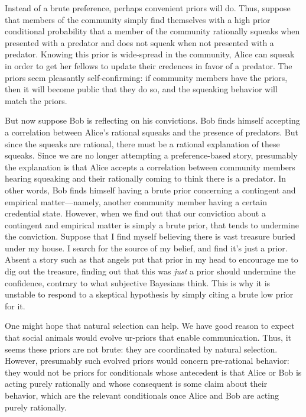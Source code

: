 Instead of a brute preference, perhaps convenient priors will do. Thus, suppose that members of the community simply find
themselves with a high prior conditional probability that a member of the community rationally squeaks when presented with a 
predator and does not squeak when not presented with a predator. Knowing this prior is wide-spread in the community, Alice can squeak in order to 
get her fellows to update their credences in favor of a predator. The priors seem pleasantly self-confirming: if community
members have the priors, then it will become public that they do so, and the squeaking behavior will match the priors.

But now suppose Bob is reflecting on his convictions. Bob finds himself accepting a correlation between Alice's rational 
squeaks and the presence of predators. But since the squeaks are rational, there must be a rational explanation of these 
squeaks. Since we are no longer attempting a preference-based story, presumably the explanation is that Alice accepts a 
correlation between community members hearing squeaking and their rationally coming to think there is a predator. In other
words, Bob finds himself having a brute prior concerning a contingent and empirical matter---namely, another community
member having a certain credential state.  However, when we find out that our conviction about a contingent and empirical 
matter is simply a brute prior, that tends to undermine the conviction. Suppose that I find myself believing there is vast treasure buried under my house. I search
for the source of my belief, and find it's just a prior. Absent a story such as that angels put that prior in my head
to encourage me to dig out the treasure, finding out that this was \textit{just} a prior should undermine the confidence,
contrary to what subjective Bayesians think. This is why it is unstable to respond to a skeptical hypothesis by simply
citing a brute low prior for it. 

One might hope that natural selection can help. We have good reason to expect that social animals would evolve
ur-priors that enable communication. Thus, it seems these priors are not brute: they are coordinated by natural selection.
However, presumably such evolved priors would concern pre-rational behavior: they would not be priors for 
conditionals whose antecedent is that Alice or Bob is acting purely rationally and whose consequent is some
claim about their behavior, which are the relevant conditionals once Alice and Bob are acting purely rationally.

